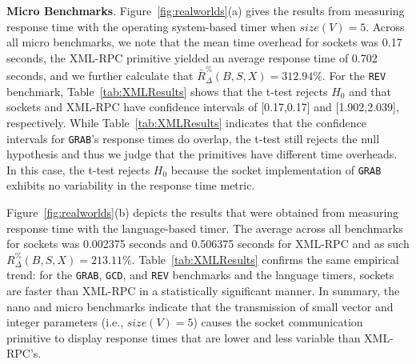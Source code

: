 \documentclass{sig-alternate}
\begin{document}
{\bf Micro Benchmarks}. Figure~\ref{fig:realworlds}(a) gives the
results from measuring response time with the operating system-based
timer when $size(V) = 5$.  Across all micro benchmarks, we note that
the mean time overhead for sockets was 0.17 seconds, the XML-RPC
primitive yielded an average response time of 0.702 seconds, and we
further calculate that {\small $\bar{R}_\Delta^\%(B,S,X)$}$=312.94\%$.
For the \texttt{REV} benchmark, Table~\ref{tab:XMLResults} shows that
the t-test rejects $H_0$ and that sockets and XML-RPC have confidence
intervals of [0.17,0.17] and [1.902,2.039], respectively.  While
Table~\ref{tab:XMLResults} indicates that the confidence intervals for
{\tt GRAB}'s response times do overlap, the t-test still rejects the
null hypothesis and thus we judge that the primitives have different
time overheads.  In this case, the t-test rejects $H_0$ because the
socket implementation of {\tt GRAB} exhibits no variability in the
response time metric.




Figure~\ref{fig:realworlds}(b) depicts the results that were obtained
from measuring response time with the language-based timer. The
average across all benchmarks for sockets was 0.002375 seconds and
0.506375 seconds for XML-RPC and as such {\small
  $R_\Delta^\%(B,S,X)$}$=213.11\%$.  Table~\ref{tab:XMLResults}
confirms the same empirical trend: for the {\tt GRAB}, {\tt GCD}, and
{\tt REV} benchmarks and the language timers, sockets are faster than
XML-RPC in a statistically significant manner.  In summary, the nano
and micro benchmarks indicate that the transmission of small vector
and integer parameters (i.e., $size(V)=5$) causes the socket
communication primitive to display response times that are lower and
less variable than XML-RPC's.
\end{document}
